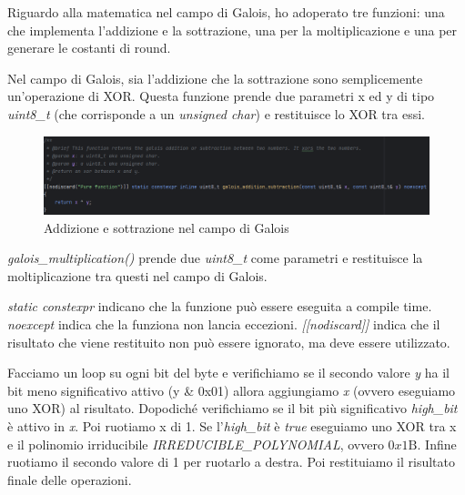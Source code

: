  

\textsf{\small Riguardo alla matematica nel campo di Galois, ho adoperato tre funzioni: una che implementa l'addizione e la sottrazione, una per la moltiplicazione e una per generare le costanti di round.}

  

\textsf{\small Nel campo di Galois, sia l'addizione che la sottrazione sono semplicemente un'operazione di XOR. Questa funzione prende due parametri x ed y di tipo \emph{uint8\_t} (che corrisponde a un \emph{unsigned char}) e restituisce lo XOR tra essi.}

\begin{figure}[H]
	\centering
	\includegraphics[width=1\textwidth, height=1\textheight, keepaspectratio]{./images/code/cpp/galois_math/galois_addition_subtraction.PNG}
	\caption{Addizione e sottrazione nel campo di Galois}
	\label{fig:galois_addition_subtraction}
\end{figure}

\textsf{\small \emph{galois\_multiplication()} prende due \emph{uint8\_t} come parametri e restituisce la moltiplicazione tra questi nel campo di Galois.}

\textsf{\emph{static constexpr} indicano che la funzione può essere eseguita a compile time. \emph{noexcept} indica che la funziona non lancia eccezioni. \emph{[[nodiscard]]} indica che il risultato che viene restituito non può essere ignorato, ma deve essere utilizzato.}



\textsf{\small Facciamo un loop su ogni bit del byte e verifichiamo se il secondo valore \emph{y} ha il bit meno significativo attivo (y \& 0x01) allora aggiungiamo \emph{x} (ovvero eseguiamo uno XOR) al risultato. Dopodiché verifichiamo se il bit più significativo \emph{high\_bit} è attivo in \emph{x}. Poi ruotiamo x di 1. Se l'\emph{high\_bit} è \emph{true} eseguiamo uno XOR tra x e il polinomio irriducibile \emph{IRREDUCIBLE\_POLYNOMIAL}, ovvero $0x1\text{B}$. Infine ruotiamo il secondo valore di 1 per ruotarlo a destra. Poi restituiamo il risultato finale delle operazioni.}

